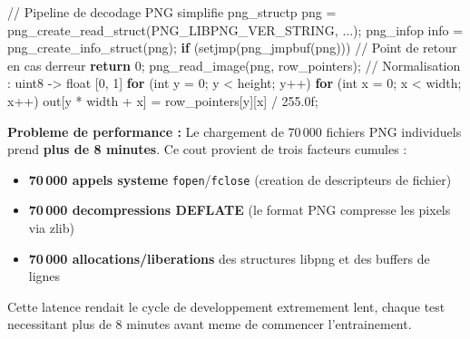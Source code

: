 \documentclass[
  letterpaper,
  DIV=11,
  numbers=noendperiod]{scrartcl}
\newenvironment{Shaded}{\begin{snugshade}}{\end{snugshade}}
\newcommand{\BuiltInTok}[1]{\textcolor[rgb]{0.00,0.23,0.31}{#1}}
\newcommand{\CommentTok}[1]{\textcolor[rgb]{0.37,0.37,0.37}{#1}}
\newcommand{\ControlFlowTok}[1]{\textcolor[rgb]{0.00,0.23,0.31}{\textbf{#1}}}
\newcommand{\DataTypeTok}[1]{\textcolor[rgb]{0.68,0.00,0.00}{#1}}
\newcommand{\DecValTok}[1]{\textcolor[rgb]{0.68,0.00,0.00}{#1}}
\newcommand{\FloatTok}[1]{\textcolor[rgb]{0.68,0.00,0.00}{#1}}
\newcommand{\NormalTok}[1]{\textcolor[rgb]{0.00,0.23,0.31}{#1}}
\newcommand{\OperatorTok}[1]{\textcolor[rgb]{0.37,0.37,0.37}{#1}}
\providecommand{\tightlist}{%
  \setlength{\itemsep}{0pt}\setlength{\parskip}{0pt}}
\begin{document}
\begin{Shaded}
\begin{Highlighting}[]
\CommentTok{// Pipeline de decodage PNG simplifie}
\NormalTok{png\_structp png }\OperatorTok{=}\NormalTok{ png\_create\_read\_struct}\OperatorTok{(}\NormalTok{PNG\_LIBPNG\_VER\_STRING}\OperatorTok{,} \DataTypeTok{...}\OperatorTok{);}
\NormalTok{png\_infop info }\OperatorTok{=}\NormalTok{ png\_create\_info\_struct}\OperatorTok{(}\NormalTok{png}\OperatorTok{);}
\ControlFlowTok{if} \OperatorTok{(}\NormalTok{setjmp}\OperatorTok{(}\NormalTok{png\_jmpbuf}\OperatorTok{(}\NormalTok{png}\OperatorTok{)))}\NormalTok{  }\CommentTok{// Point de retour en cas d\textquotesingle{}erreur}
    \ControlFlowTok{return} \DecValTok{0}\OperatorTok{;}
\NormalTok{png\_read\_image}\OperatorTok{(}\NormalTok{png}\OperatorTok{,}\NormalTok{ row\_pointers}\OperatorTok{);}
\CommentTok{// Normalisation : uint8 -> float [0, 1]}
\ControlFlowTok{for} \OperatorTok{(}\DataTypeTok{int}\NormalTok{ y }\OperatorTok{=} \DecValTok{0}\OperatorTok{;}\NormalTok{ y }\OperatorTok{\textless{}}\NormalTok{ height}\OperatorTok{;}\NormalTok{ y}\OperatorTok{++)}
    \ControlFlowTok{for} \OperatorTok{(}\DataTypeTok{int}\NormalTok{ x }\OperatorTok{=} \DecValTok{0}\OperatorTok{;}\NormalTok{ x }\OperatorTok{\textless{}}\NormalTok{ width}\OperatorTok{;}\NormalTok{ x}\OperatorTok{++)}
\NormalTok{        out}\OperatorTok{[}\NormalTok{y }\OperatorTok{*}\NormalTok{ width }\OperatorTok{+}\NormalTok{ x}\OperatorTok{]} \OperatorTok{=}\NormalTok{ row\_pointers}\OperatorTok{[}\NormalTok{y}\OperatorTok{][}\NormalTok{x}\OperatorTok{]} \OperatorTok{/} \FloatTok{255.0}\BuiltInTok{f}\OperatorTok{;}
\end{Highlighting}
\end{Shaded}

\textbf{Probleme de performance :} Le chargement de 70\,000 fichiers PNG individuels prend \textbf{plus de 8 minutes}. Ce cout provient de trois facteurs cumules :
\begin{itemize}
\tightlist
\item \textbf{70\,000 appels systeme} \texttt{fopen}/\texttt{fclose} (creation de descripteurs de fichier)
\item \textbf{70\,000 decompressions DEFLATE} (le format PNG compresse les pixels via zlib)
\item \textbf{70\,000 allocations/liberations} des structures libpng et des buffers de lignes
\end{itemize}
Cette latence rendait le cycle de developpement extremement lent, chaque test necessitant plus de 8 minutes avant meme de commencer l'entrainement.
\end{document}
